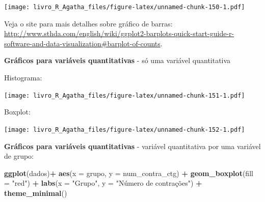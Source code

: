 \documentclass[
]{book}
\newenvironment{Shaded}{\begin{snugshade}}{\end{snugshade}}
\newcommand{\DataTypeTok}[1]{\textcolor[rgb]{0.13,0.29,0.53}{#1}}
\newcommand{\KeywordTok}[1]{\textcolor[rgb]{0.13,0.29,0.53}{\textbf{#1}}}
\newcommand{\NormalTok}[1]{#1}
\newcommand{\OperatorTok}[1]{\textcolor[rgb]{0.81,0.36,0.00}{\textbf{#1}}}
\newcommand{\StringTok}[1]{\textcolor[rgb]{0.31,0.60,0.02}{#1}}
\begin{document}
\texttt{[image: livro\_R\_Agatha\_files/figure-latex/unnamed-chunk-150-1.pdf]}

Veja o site para mais detalhes sobre gráfico de barras:
\url{http://www.sthda.com/english/wiki/ggplot2-barplots-quick-start-guide-r-software-and-data-visualization\#barplot-of-counts}.

\textbf{Gráficos para variáveis quantitativas} - só uma variável quantitativa

Histograma:

\begin{Shaded}
\end{Shaded}

\texttt{[image: livro\_R\_Agatha\_files/figure-latex/unnamed-chunk-151-1.pdf]}

Boxplot:

\begin{Shaded}
\end{Shaded}

\texttt{[image: livro\_R\_Agatha\_files/figure-latex/unnamed-chunk-152-1.pdf]}

\textbf{Gráficos para variáveis quantitativas} - variável quantitativa por uma variável de grupo:

\begin{Shaded}
\begin{Highlighting}[]
\KeywordTok{ggplot}\NormalTok{(dados)}\OperatorTok{+}
\StringTok{  }\KeywordTok{aes}\NormalTok{(}\DataTypeTok{x =}\NormalTok{ grupo, }\DataTypeTok{y =}\NormalTok{ num_contra_ctg) }\OperatorTok{+}
\StringTok{  }\KeywordTok{geom_boxplot}\NormalTok{(}\DataTypeTok{fill =} \StringTok{"red"}\NormalTok{) }\OperatorTok{+}
\StringTok{  }\KeywordTok{labs}\NormalTok{(}\DataTypeTok{x =} \StringTok{"Grupo"}\NormalTok{, }\DataTypeTok{y =} \StringTok{"Número de contrações"}\NormalTok{) }\OperatorTok{+}
\StringTok{  }\KeywordTok{theme_minimal}\NormalTok{()}
\end{Highlighting}
\end{Shaded}
\end{document}
